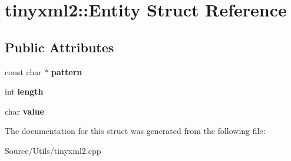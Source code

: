 \hypertarget{structtinyxml2_1_1_entity}{}\section{tinyxml2\+:\+:Entity Struct Reference}
\label{structtinyxml2_1_1_entity}
\subsection*{Public Attributes}
\begin{DoxyCompactItemize}
\item 
\mbox{\label{structtinyxml2_1_1_entity_ab330f5d665d29bfc811ecfa76315894b}} 
const char $\ast$ {\bfseries pattern}
\item 
\mbox{\label{structtinyxml2_1_1_entity_a25e2b57cb59cb4fa68f283d7cb570f21}} 
int {\bfseries length}
\item 
\mbox{\label{structtinyxml2_1_1_entity_a7334e81e33b4615655a403711b24f3ed}} 
char {\bfseries value}
\end{DoxyCompactItemize}


The documentation for this struct was generated from the following file\+:\begin{DoxyCompactItemize}
\item 
Source/\+Utils/tinyxml2.\+cpp\end{DoxyCompactItemize}
